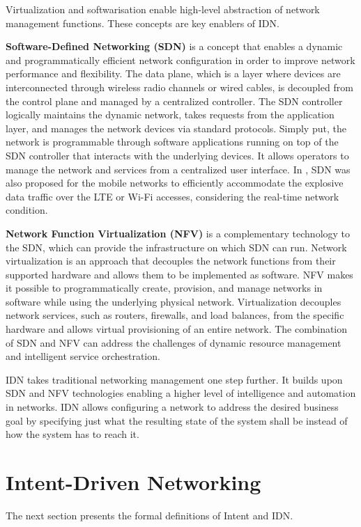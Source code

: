 Virtualization and softwarisation enable high-level abstraction of network management functions. These concepts are key enablers of IDN.

\textbf{Software-Defined Networking (SDN)} is a concept that enables a dynamic and programmatically efficient network configuration in order to improve network performance and flexibility. The data plane, which is a layer where devices are interconnected through wireless radio channels or wired cables, is decoupled from the control plane and managed by a centralized controller\cite{Li2015}. The SDN controller logically maintains the dynamic network, takes requests from the application layer, and manages the network devices via standard protocols. Simply put, the network is programmable through software applications running on top of the SDN controller that interacts with the underlying devices. It allows operators to manage the network and services from a centralized user interface. In \cite{Amani2014}, SDN was also proposed for the mobile networks to efficiently accommodate the explosive data traffic over the LTE or Wi-Fi accesses, considering the real-time network condition.

\textbf{Network Function Virtualization (NFV)} is a complementary technology to the SDN, which can provide the infrastructure on which SDN can run. Network virtualization is an approach that decouples the network functions from their supported hardware and allows them to be implemented as software. NFV makes it possible to programmatically create, provision, and manage networks in software while using the underlying physical network. Virtualization decouples network services, such as routers, firewalls, and load balances, from the specific hardware and allows virtual provisioning of an entire network. The combination of SDN and NFV can address the challenges of dynamic resource management and intelligent service orchestration.\cite{Li2015}

IDN takes traditional networking management one step further. It builds upon SDN and NFV technologies enabling a higher level of intelligence and automation in networks. IDN allows configuring a network to address the desired business goal by specifying just what the resulting state of the system shall be instead of how the system has to reach it.


\section{Intent-Driven Networking}
\label{sec:Intent_Driven_Networking}
The next section presents the formal definitions of Intent and IDN. 


